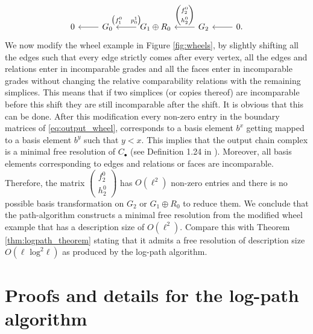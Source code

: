 \documentclass[11pt]{article}
\begin{document}
\begin{equation} \label{eq:output_wheel}
\begin{tikzcd}[ampersand replacement=\&]
0 \& G_0  \arrow[l]
  \& G_1\oplus R_0 \arrow{l}[swap]{\begin{pmatrix}f_1^0 & p_0^1 \end{pmatrix}} 
  \& G_2 \arrow{l}[swap]{\begin{pmatrix}f_2^0 \\ h^0_2 \end{pmatrix}} 
  \& 0 \arrow[l] .
\end{tikzcd}
\end{equation}
We now modify the wheel example in Figure \ref{fig:wheels}, by slightly shifting all the edges such that every edge strictly comes after every vertex, all the edges and relations enter in incomparable grades and all the faces enter in incomparable grades without changing the relative comparability relations with the remaining simplices. This means that if two simplices (or copies thereof) are incomparable before this shift they are still incomparable after the shift. It is obvious that this can be done. After this modification every non-zero entry in the boundary matrices of \eqref{eq:output_wheel}, corresponds to a basis element $b^x$ getting mapped to a basis element $b^y$ such that $y<x$. This implies that the output chain complex is a minimal free resolution of $C_\bullet$ (see Definition 1.24 in \cite{miller_sturmfels_book}). Moreover, all basis elements corresponding to edges and relations or faces are incomparable. Therefore, the matrix $\begin{pmatrix}f_2^0 \\ h^0_2 \end{pmatrix}$ has $O(\ell^2)$ non-zero entries and there is no possible basis transformation on $G_2$ or $G_1\oplus R_0$ to reduce them. We conclude that the path-algorithm constructs a minimal free resolution from the modified wheel example that has a description size of $O(\ell^2)$. Compare this with Theorem \ref{thm:logpath_theorem} stating that it admits a free resolution of description size $O(\ell\text{ log}^2\ell)$ as produced by the log-path algorithm.  
%
\section{Proofs and details for the log-path algorithm} \label{app:logpath}
%
\end{document}
